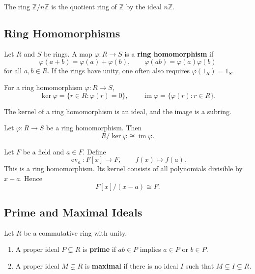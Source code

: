 \begin{example}
The ring $\mathbb{Z}/n\mathbb{Z}$ is the quotient ring of $\mathbb{Z}$ by the ideal $n\mathbb{Z}$.
\end{example}

\subsection{Ring Homomorphisms}

\begin{definition}
Let $R$ and $S$ be rings. A map $\varphi:R\to S$ is a \textbf{ring homomorphism} if
\[
    \varphi(a+b)=\varphi(a)+\varphi(b),
    \qquad
    \varphi(ab)=\varphi(a)\varphi(b)
\]
for all $a,b\in R$. If the rings have unity, one often also requires $\varphi(1_R)=1_S$.
\end{definition}

\begin{definition}
For a ring homomorphism $\varphi:R\to S$,
\[
    \ker\varphi=\{r\in R:\varphi(r)=0\},
    \qquad
    \operatorname{im}\varphi=\{\varphi(r):r\in R\}.
\]
\end{definition}

\begin{proposition}
The kernel of a ring homomorphism is an ideal, and the image is a subring.
\end{proposition}

\begin{theorem}
Let $\varphi:R\to S$ be a ring homomorphism. Then
\[
    R/\ker\varphi\cong \operatorname{im}\varphi.
\]
\end{theorem}

\begin{example}
Let $F$ be a field and $a\in F$. Define
\[
    \operatorname{ev}_a:F[x]\to F,
    \qquad
    f(x)\mapsto f(a).
\]
This is a ring homomorphism. Its kernel consists of all polynomials divisible by $x-a$. Hence
\[
    F[x]/(x-a)\cong F.
\]
\end{example}

\subsection{Prime and Maximal Ideals}

\begin{definition}
Let $R$ be a commutative ring with unity.
\begin{enumerate}
    \item A proper ideal $P\subsetneq R$ is \textbf{prime} if $ab\in P$ implies $a\in P$ or $b\in P$.
    \item A proper ideal $M\subsetneq R$ is \textbf{maximal} if there is no ideal $I$ such that $M\subsetneq I\subsetneq R$.
\end{enumerate}
\end{definition}

